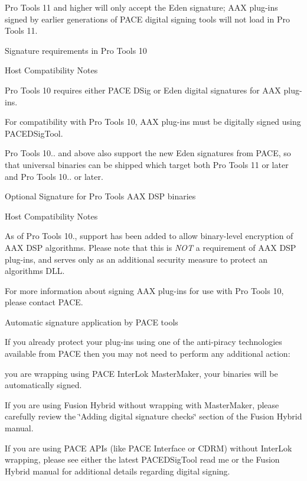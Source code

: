 Pro Tools 11 and higher will only accept the Eden signature; A\+AX plug-\/ins signed by earlier generations of P\+A\+CE digital signing tools will not load in Pro Tools 11.

 Signature requirements in Pro Tools 10

 \begin{DoxyRefDesc}{Host Compatibility Notes}
\item[\mbox{\hyperlink{a00786__compatibility_notes000013}{Host Compatibility Notes}}]Pro Tools 10 requires either P\+A\+CE D\+Sig or Eden digital signatures for A\+AX plug-\/ins.\end{DoxyRefDesc}


For compatibility with Pro Tools 10, A\+AX plug-\/ins must be digitally signed using P\+A\+C\+E\+D\+Sig\+Tool.

Pro Tools 10.. and above also support the new Eden signatures from P\+A\+CE, so that universal binaries can be shipped which target both Pro Tools 11 or later and Pro Tools 10.. or later.

 Optional Signature for Pro Tools A\+AX D\+SP binaries

 \begin{DoxyRefDesc}{Host Compatibility Notes}
\item[\mbox{\hyperlink{a00786__compatibility_notes000014}{Host Compatibility Notes}}]As of Pro Tools 10., support has been added to allow binary-\/level encryption of A\+AX D\+SP algorithms. Please note that this is {\itshape N\+OT} a requirement of A\+AX D\+SP plug-\/ins, and serves only as an additional security measure to protect an algorithm\textquotesingle{}s D\+LL. \end{DoxyRefDesc}


For more information about signing A\+AX plug-\/ins for use with Pro Tools 10, please contact P\+A\+CE.

 Automatic signature application by P\+A\+CE tools

If you already protect your plug-\/ins using one of the anti-\/piracy technologies available from P\+A\+CE then you may not need to perform any additional action\+:


\begin{DoxyItemize}
\item you are wrapping using P\+A\+CE Inter\+Lok Master\+Maker, your binaries will be automatically signed.  
\item If you are using Fusion Hybrid without wrapping with Master\+Maker, please carefully review the \char`\"{}\+Adding digital signature checks\char`\"{} section of the Fusion Hybrid manual.  
\item If you are using P\+A\+CE A\+P\+Is (like P\+A\+CE Interface or C\+D\+RM) without Inter\+Lok wrapping, please see either the latest P\+A\+C\+E\+D\+Sig\+Tool read me or the Fusion Hybrid manual for additional details regarding digital signing.  
\end{DoxyItemize}



